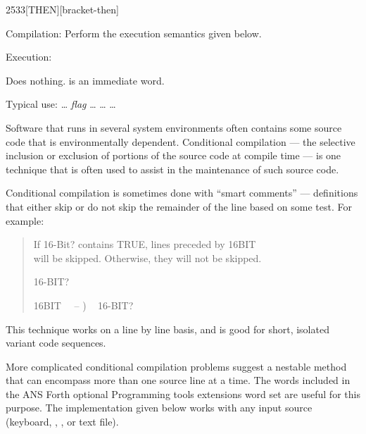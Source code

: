 \begin{newword*}{2533}{[THEN]}[bracket-then]
\item[Compilation:]
	Perform the execution semantics given below.

\item[Execution:]
	\stack{}{}

	Does nothing. \word{[THEN]} is an immediate word.

	\begin{rationale} %
		Typical use:
			{\ldots} \emph{flag}
			\word[tools]{[IF]} {\ldots}
			\word[tools]{[ELSE]} {\ldots}
			\word[tools]{[THEN]} {\ldots}

		Software that runs in several system environments often
		contains some source code that is environmentally dependent.
		Conditional compilation --- the selective inclusion or
		exclusion of portions of the source code at compile time ---
		is one technique that is often used to assist in the
		maintenance of such source code.

		Conditional compilation is sometimes done with ``smart
		comments'' --- definitions that either skip or do not skip
		the remainder of the line based on some test. For example:

		\begin{quote}\ttfamily
			 If 16-Bit? contains TRUE, lines preceded by 16BIT\bs \\
			 will be skipped. Otherwise, they will not be skipped.

			 16-BIT?

			\word{:} 16BIT\bs~~ -- ) ~
				16-BIT?  ~
				 ~   ~  \\
			\word{;} 
		\end{quote}

		This technique works on a line by line basis, and is good for
		short, isolated variant code sequences.

		More complicated conditional compilation problems suggest a
		nestable method that can encompass more than one source line
		at a time. The words included in the ANS Forth optional
		Programming tools extensions word set are useful for this
		purpose. The implementation given below works with any input
		source (keyboard, , , or
		text file).


\end{rationale}
\end{newword*}
